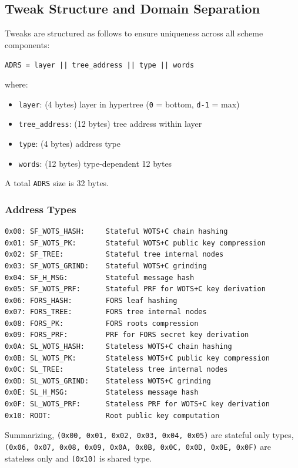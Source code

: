 \subsection{Tweak Structure and Domain Separation}
Tweaks are structured as follows to ensure uniqueness across all scheme components:

\begin{center}
\texttt{ADRS = layer || tree\_address || type || words}
\end{center}
where: 
\begin{itemize}
    \item[] \texttt{layer}: (4 bytes) layer in hypertree (\texttt{0} = bottom, \texttt{d-1} = max)
    \item[] \texttt{tree\_address}: (12 bytes) tree address within layer
    \item[] \texttt{type}: (4 bytes) address type
    \item[] \texttt{words}: (12 bytes) type-dependent 12 bytes
\end{itemize}
A total \texttt{ADRS} size is 32 bytes.

\subsubsection{Address Types}
\begin{verbatim}
0x00: SF_WOTS_HASH:     Stateful WOTS+C chain hashing
0x01: SF_WOTS_PK:       Stateful WOTS+C public key compression
0x02: SF_TREE:          Stateful tree internal nodes
0x03: SF_WOTS_GRIND:    Stateful WOTS+C grinding
0x04: SF_H_MSG:         Stateful message hash
0x05: SF_WOTS_PRF:      Stateful PRF for WOTS+C key derivation
0x06: FORS_HASH:        FORS leaf hashing
0x07: FORS_TREE:        FORS tree internal nodes
0x08: FORS_PK:          FORS roots compression
0x09: FORS_PRF:         PRF for FORS secret key derivation
0x0A: SL_WOTS_HASH:     Stateless WOTS+C chain hashing
0x0B: SL_WOTS_PK:       Stateless WOTS+C public key compression
0x0C: SL_TREE:          Stateless tree internal nodes
0x0D: SL_WOTS_GRIND:    Stateless WOTS+C grinding
0x0E: SL_H_MSG:         Stateless message hash
0x0F: SL_WOTS_PRF:      Stateless PRF for WOTS+C key derivation
0x10: ROOT:             Root public key computation
\end{verbatim}
Summarizing, \texttt{(0x00, 0x01, 0x02, 0x03, 0x04, 0x05)} are stateful only types, \texttt{(0x06, 0x07, 0x08, 0x09, 0x0A, 0x0B, 0x0C, 0x0D, 0x0E, 0x0F)} are stateless only and \texttt{(0x10)} is shared type. 

